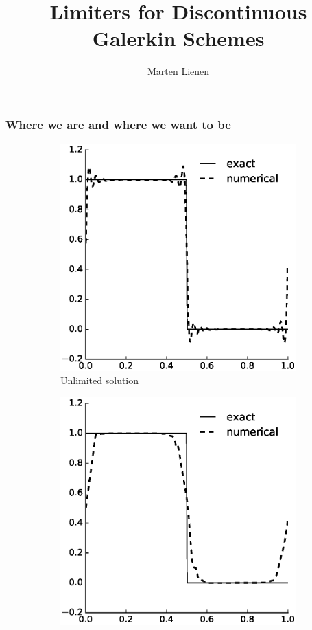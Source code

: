\documentclass[11pt]{beamer}
\title{Limiters for Discontinuous Galerkin Schemes}
\author{Marten Lienen}
\institute{Technische Universität München}
\date{}
\begin{document}
\maketitle

\begin{frame}
  \frametitle{Where we are and where we want to be}
  \vspace{.8em}
  \begin{figure}[h]
    \centering
    \begin{subfigure}{0.45\textwidth}
      \centering
      \includegraphics[width=\textwidth]{figures/context/unlimited}
      \caption{Unlimited solution}
    \end{subfigure}
    \hfill
    \begin{subfigure}{0.45\textwidth}
      \centering
      \includegraphics[width=\textwidth]{figures/context/minmod}

\end{subfigure}
\end{figure}
\end{frame}
\end{document}
